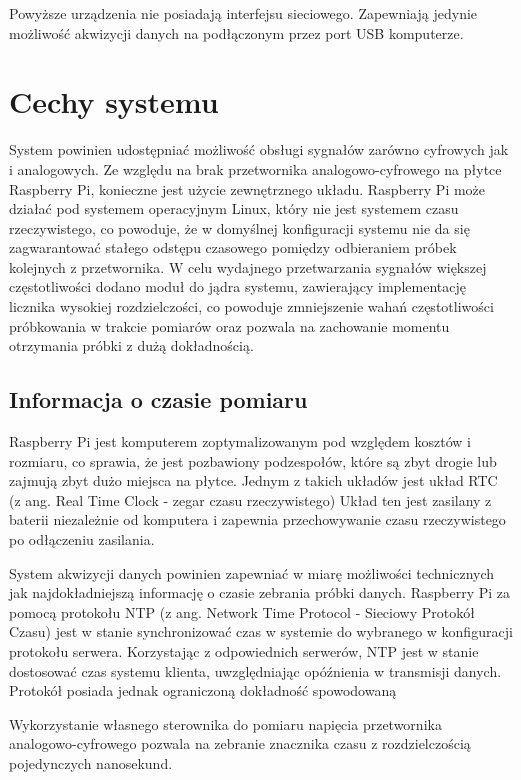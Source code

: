 Powyższe urządzenia nie posiadają interfejsu sieciowego. Zapewniają jedynie możliwość akwizycji danych na podłączonym przez port USB komputerze.

\section{Cechy systemu}
System powinien udostępniać możliwość obsługi sygnałów zarówno cyfrowych jak i analogowych. Ze względu na brak przetwornika analogowo-cyfrowego na płytce Raspberry Pi, konieczne jest użycie zewnętrznego układu.
Raspberry Pi może działać pod systemem operacyjnym Linux, który nie jest systemem czasu rzeczywistego, co powoduje, że w domyślnej konfiguracji systemu nie da się zagwarantować stałego odstępu czasowego pomiędzy odbieraniem próbek kolejnych z przetwornika. W celu wydajnego przetwarzania sygnałów większej częstotliwości dodano moduł do jądra systemu, zawierający implementację licznika wysokiej rozdzielczości, co powoduje zmniejszenie wahań częstotliwości próbkowania w trakcie pomiarów oraz pozwala na zachowanie momentu otrzymania próbki z dużą dokładnością.

\subsection{Informacja o czasie pomiaru}

Raspberry Pi jest komputerem zoptymalizowanym pod względem kosztów i rozmiaru, co sprawia, że jest pozbawiony podzespołów, które są zbyt drogie lub zajmują zbyt dużo miejsca na płytce. Jednym z takich układów jest układ RTC (z ang. Real Time Clock - zegar czasu rzeczywistego) Układ ten jest zasilany z baterii niezależnie od komputera i zapewnia przechowywanie czasu rzeczywistego po odłączeniu zasilania. 

System akwizycji danych powinien zapewniać w miarę możliwości technicznych jak najdokładniejszą informację o czasie zebrania próbki danych.
Raspberry Pi za pomocą protokołu NTP (z ang. Network Time Protocol - Sieciowy Protokół Czasu) jest w stanie synchronizować czas w systemie do wybranego w konfiguracji protokołu serwera. Korzystając z odpowiednich serwerów, NTP jest w stanie dostosować czas systemu klienta, uwzględniając opóźnienia w transmisji danych. Protokół posiada jednak ograniczoną dokładność spowodowaną

Wykorzystanie własnego sterownika do pomiaru napięcia przetwornika analogowo-cyfrowego pozwala na zebranie znacznika czasu z rozdzielczością pojedynczych nanosekund. 

